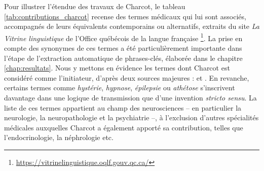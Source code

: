 Pour illustrer l'étendue des travaux de Charcot, le tableau \ref{tab:contributions_charcot} recense des termes médicaux qui lui sont associés, accompagnés de leurs équivalents contemporains ou alternatifs, extraits du site \textit{La Vitrine linguistique} de l'Office québécois de la langue française \footnote{\url{https://vitrinelinguistique.oqlf.gouv.qc.ca/}}. La prise en compte des synonymes de ces termes a été particulièrement importante dans l'étape de l'extraction automatique de phrases-clés, élaborée dans le chapitre \ref{chap:resultats}. Nous y mettons en évidence les termes dont Charcot est considéré comme l'initiateur, d'après deux sources majeures : \citet{walusinski} et \citet{camargo2023}. En revanche, certains termes comme \textit{hystérie}, \textit{hypnose}, \textit{épilepsie} ou \textit{athétose} s'inscrivent davantage dans une logique de transmission que d'une invention \textit{stricto sensu}. La liste de ces termes appartient au champ des neurosciences -- en particulier la neurologie, la neuropathologie et la psychiatrie --, à l'exclusion d'autres spécialités médicales auxquelles Charcot a également apporté sa contribution, telles que l'endocrinologie, la néphrologie etc.

